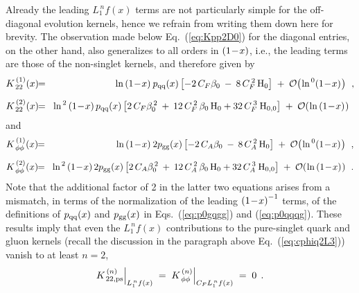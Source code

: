 \documentclass[12pt]{article}
\newcommand{\beq}{\begin{equation}}
\newcommand{\eeq}{\end{equation}}
\newcommand{\bea}{\begin{eqnarray}}
\newcommand{\eea}{\end{eqnarray}}
\begin{document}
Already the leading $L_1^{\,n} f(x)$ terms are not particularly simple for the 
off-diagonal evolution kernels, hence we refrain from writing them down here
for brevity. The observation made below Eq.~(\ref{eq:Kpp2D0}) for the diagonal 
entries, on the other hand, also generalizes to all orders in $\x1$, i.e., 
the leading terms are those of the non-singlet kernels, and therefore given by 
\cite{MV5}
%
\bea
\label{K22L1}
  K_{\, 22}^{\,(1)}(x) &\!\! = \!&
  \ln \x1 \: \* \pqq(x) \* \left[
      -2\, \* \cf \* \beta_0 \:-\: 8\, \* \cfs\, \* \H(0) \right]
%
      \;+\; {\cal O} \! \left( \:\!\ln^{\,0} \!\x1 \:\!\right) \:\: ,
 \\[2mm]
%
\label{K22L2}
 K_{\, 22}^{\,(2)}(x) &\!\! = \!&
      \ln^{\,2} \x1 \, \* \pqq(x) \* \left[
      2\, \* \cf \* \beta_0^{\,2} \:+\: 12\, \* \cfs\, \* \beta_0\, \* \H(0)
      + 32\, \* \cft\: \* \Hh(0,0) \right]
%
     \;+\; {\cal O} \! \left( \:\!\ln \x1 \:\!\right) 
 \;\;
\eea
%
and
%
\bea
\label{KppL1}
  K_{\, \phi\phi}^{\,(1)}(x) &\!\! = \!&
  \ln \x1 \: \* 2 \* \pgg(x) \* \left[
      -2\, \* \ca \* \beta_0 \:-\: 8\, \* \cas\, \* \H(0) \right]
%
      \;+\; {\cal O} \! \left( \:\!\ln^{\,0} \!\x1 \:\!\right) \:\: ,
 \\[2mm]
%
\label{KppL2}
 K_{\, \phi\phi}^{\,(2)}(x) &\!\! = \!&
      \ln^{\,2} \x1 \, \* 2 \* \pgg(x) \* \left[
      2\, \* \ca \* \beta_0^{\,2} \:+\: 12\, \* \cas\, \* \beta_0\, \* \H(0)
      + 32\, \* \cat\: \* \Hh(0,0) \right]
%
     \;+\; {\cal O} \! \left( \:\!\ln \x1 \:\!\right)
 \:\: .
\eea
%
Note that the additional factor of 2 in the latter two equations arises from 
a mismatch, in terms of the normalization of the leading $\x1^{-1}$ terms, of
the definitions of $\pqq(x)$ and $\pgg(x)$ in Eqs.~(\ref{eq:p0gqgg}) and 
(\ref{eq:p0qqqg}). These results imply that even the $L_1^{\,n} f(x)$ 
contributions to the pure-singlet quark and gluon kernels (recall the 
discussion in the paragraph above Eq.~(\ref{eq:cphiq2L3})) vanish to at least
$n=2$,
%
\beq
\label{KdiagL}
 K_{\,\rm 22, ps }^{\,(n)} \Big|_{L_1^{\,n} f(x)}    \; = \;
 K_{\,\phi\phi }^{\,(n)} \Big|_{\cf L_1^{\,n} f(x) } \; = \; 0
\:\: .
\eeq
\end{document}
